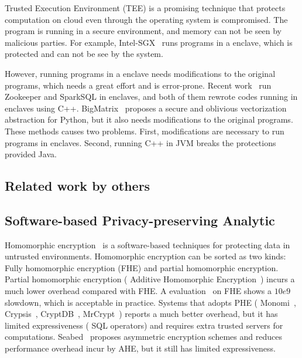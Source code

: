 Trusted Execution Environment (TEE) is a promising technique that
protects computation on cloud even through the operating system is
compromised. The program is running in a secure environment, and memory can not
be seen by malicious parties. For example, Intel-SGX~\cite{intel-sgx} runs 
programs
in a enclave, which is protected and can not be see by the system.

However, running programs in a enclave needs modifications to the original
programs, which needs a great effort and is error-prone. Recent
work~\cite{securekeeper,opaque:nsdi17} run Zookeeper and SparkSQL in enclaves,
and both of them rewrote codes running in enclaves using C++.
BigMatrix~\cite{bigmatrix:ccs17} proposes a secure and oblivious vectorization
abstraction for Python, but it also needs modifications to the original 
programs.
These methods causes two problems. First, modifications are necessary to run
programs in enclaves. Second, running C++ in JVM breaks the protections
provided Java.




\subsection{Related work by others} 
\label{sec:others-work}\vspace{-.075in}

\subsection{Software-based Privacy-preserving Analytic}
Homomorphic encryption~\cite{fullmomo:stoc09,paillier,elgamal} is a 
software-based
techniques for protecting data in untrusted environments. Homomorphic encryption
can be sorted as two kinds: Fully homomorphic encryption (FHE) and partial 
homomorphic encryption.
Partial homomorphic encryption (\eg{} Additive Homomorphic 
Encryption~\cite{paillier})
incurs a much lower overhead compared with FHE. A evaluation~\cite{homo:eval} on
FHE shows a $10e9$ slowdown, which is acceptable in practice.
Systems that adopts PHE (\eg{} Monomi~\cite{monomi:vldb13},
Crypsis~\cite{crypsis:hotcloud14}, CryptDB~\cite{cryptdb:sosp11},
MrCrypt~\cite{mrcrypt:oospsla14})
reports a much better overhead, but it has limited expressiveness
(\eg{} SQL operators) and requires extra trusted servers for computations.
Seabed~\cite{seabed:osdi16} proposes asymmetric encryption schemes and reduces 
performance overhead
incur by AHE, but it still has limited expressiveness.

